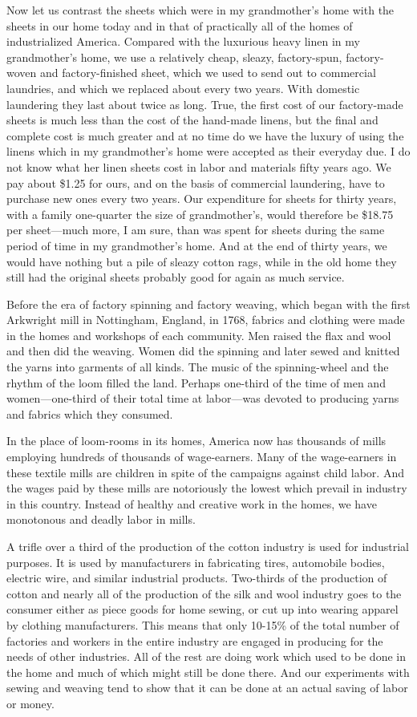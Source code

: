 \documentclass{book}
\begin{document}
Now let us contrast the sheets which were in my grandmother’s home with the sheets in our home today and in that of practically all of the homes of industrialized America. Compared with the luxurious heavy linen in my grandmother’s home, we use a relatively cheap, sleazy, factory-spun, factory-woven and factory-finished sheet, which we used to send out to commercial laundries, and which we replaced about every two years. With domestic laundering they last about twice as long. True, the first cost of our factory-made sheets is much less than the cost of the hand-made linens, but the final and complete cost is much greater and at no time do we have the luxury of using the linens which in my grandmother’s home were accepted as their everyday due. I do not know what her linen sheets cost in labor and materials fifty years ago. We pay about \$1.25 for ours, and on the basis of commercial laundering, have to purchase new ones every two years. Our expenditure for sheets for thirty years, with a family one-quarter the size of grandmother’s, would therefore be \$18.75 per sheet—much more, I am sure, than was spent for sheets during the same period of time in my grandmother’s home. And at the end of thirty years, we would have nothing but a pile of sleazy cotton rags, while in the old home they still had the original sheets probably good for again as much service.

Before the era of factory spinning and factory weaving, which began with the first Arkwright mill in Nottingham, England, in 1768, fabrics and clothing were made in the homes and workshops of each community. Men raised the flax and wool and then did the weaving. Women did the spinning and later sewed and knitted the yarns into garments of all kinds. The music of the spinning-wheel and the rhythm of the loom filled the land. Perhaps one-third of the time of men and women—one-third of their total time at labor—was devoted to producing yarns and fabrics which they consumed.

In the place of loom-rooms in its homes, America now has thousands of mills employing hundreds of thousands of wage-earners. Many of the wage-earners in these textile mills are children in spite of the campaigns against child labor. And the wages paid by these mills are notoriously the lowest which prevail in industry in this country. Instead of healthy and creative work in the homes, we have monotonous and deadly labor in mills.

A trifle over a third of the production of the cotton industry is used for industrial purposes. It is used by manufacturers in fabricating tires, automobile bodies, electric wire, and similar industrial products. Two-thirds of the production of cotton and nearly all of the production of the silk and wool industry goes to the consumer either as piece goods for home sewing, or cut up into wearing apparel by clothing manufacturers. This means that only 10-15\% of the total number of factories and workers in the entire industry are engaged in producing for the needs of other industries. All of the rest are doing work which used to be done in the home and much of which might still be done there. And our experiments with sewing and weaving tend to show that it can be done at an actual saving of labor or money.
\end{document}
